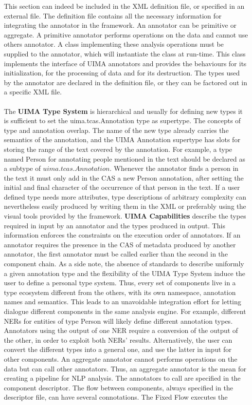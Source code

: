\documentclass{wileysev}
\begin{document}
This section can indeed be included in the XML definition file, or specified in an external file.
The definition file contains all the necessary information for integrating the annotator in the framework. An annotator can be primitive or aggregate. A primitive annotator performs operations on the data and cannot use others annotator. A class implementing these analysis operations must be supplied to the annotator, which will instantiate the class at run-time.
This class implements the interface of UIMA annotators and provides the behaviours for its initialization, for the processing of data and for its destruction. The types used by the annotator are declared in the definition file, or they can be factored out in a specific XML file.\\\\
The \textbf{UIMA Type System} is hierarchical and usually for defining new types it is sufficient to set the uima.tcas.Annotation type as supertype. The concepts of type and annotation overlap. The name of the new type already carries the semantics of the annotation, and the UIMA Annotation supertype has slots for storing the range of the text covered by the annotation. For example, a type named Person for annotating people mentioned in the text should be declared as a subtype of $uima.tcas.Annotation$. Whenever the annotator finds a person in the text it must only add in the CAS a new Person annotation, after setting the initial and final character of the occurrence of that person in the text. If a user defined type needs more attributes, type descriptions of arbitrary complexity can nevertheless easily produced by writing them in the XML or preferably using the visual tools provided by the framework. \textbf{UIMA Capabilities} describe the types required in input by an annotator and the types produced in output. This information enforces the constraints on the execution order of annotators. If an annotator requires the presence in the CAS of metadata produced by another annotator, the first annotator must be called earlier than the second in the component chain. As a side note, the absence of standards to describe uniformly a given annotation type and the flexibility of the UIMA Type System induce the user to define a personal type system. Thus, every set of components live in a type ecosystem different from the others, with its own namespace, annotation names and semantics. This leads to an unavoidable integration effort for letting dialogue different components in the same analysis engine. For example, different NERs for entities of type Person will likely define different annotation types. Annotators using the output of one NER require a conversion of the output of the other, in order to exploit both NERs’ results. Alternatively, the user can convert the different types into a general one, and use the latter in input for other components. An aggregate annotator cannot performs operations on the data but can call other annotators. Thus, an aggregate annotator is the mean for creating a pipeline for NLP analysis. The annotators to call are specified in the component descriptor. The flow between components, always specified in the descriptor file, can have several connotations. The Fixed Flow executes the 
\end{document}
